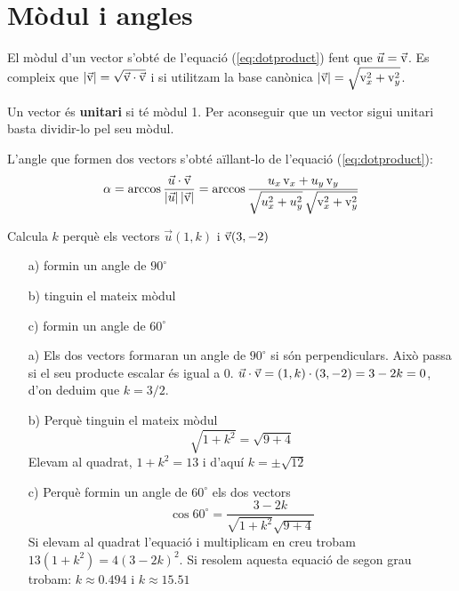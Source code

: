 \section{Mòdul i angles}
\begin{theorybox}
	El mòdul d'un vector s'obté de l'equació (\ref{eq:dotproduct}) fent que $\vec u = \vec{\mathrm{v}}$. Es compleix que $|\vec{\mathrm{v}}| = \sqrt{\vec{\mathrm{v}} \cdot \vec{\mathrm{v}}}$ i si utilitzam la base canònica  $| \vec{\mathrm{v}} |=\sqrt{\mathrm{v}_x^2+\mathrm{v}_y^2}$.
	
	Un vector és \textbf{unitari} si té mòdul 1. Per aconseguir que un vector sigui unitari basta dividir-lo pel seu mòdul.
	
	L'angle que formen dos vectors s'obté aïllant-lo de l'equació  (\ref{eq:dotproduct}):
	 \begin{equation}
	\label{eq:angle}
	\alpha = \arccos \dfrac{\vec u \cdot \vec{\mathrm{v}}}{|\vec u|\, |\vec{\mathrm{v}}|} = \arccos \dfrac{ u_x \, \mathrm{v}_x + u_y\, \mathrm{v}_y }{\sqrt{u_x^2+u_y^2} \, \sqrt{\mathrm{v}_x^2+\mathrm{v}_y^2}} 
	\end{equation}
\end{theorybox}


\begin{resolt}[E]{Calcula $k$ perquè els vectors $\vec u(1, k)$ i $\vec{\mathrm{v}}(3,-2)$ \vspace{1em}
		
		\begin{enumerate}\setlength\itemsep{1em}
			\item[a)] formin un angle de $90^\circ$
			
			
			
			\item[b)] tinguin el mateix mòdul
			
			
			\item[c)] formin un angle de $60^\circ$
		\end{enumerate}	
	}
\begin{enumerate} 
	\item[a)] Els dos vectors formaran un angle de $90^\circ$ si són perpendiculars. Això passa si el seu producte escalar és igual a 0. $\vec u \cdot \vec{\mathrm{v}} = (1, k) \cdot (3,-2) = 3-2k=0$, d'on deduim que $k=3/2$. 
	
	\item[b)] Perquè tinguin el mateix mòdul
	\begin{equation*}
	\sqrt{1+k^2} = \sqrt{9+4}
	\end{equation*}
	Elevam al quadrat, $1+k^2=13$ i d'aquí $k=\pm \sqrt{12}$
	
	
	\item[c)] Perquè formin un angle de $60^\circ$ els dos vectors
	\begin{equation*}
	\cos 60^\circ = \frac{3-2k}{\sqrt{1+k^2}\sqrt{9+4}}
	\end{equation*}
	Si elevam al quadrat l'equació i multiplicam en creu trobam $13(1+k^2)=4(3-2k)^2$. Si resolem aquesta equació de segon grau trobam: $k\approx 0.494$ i $k\approx 15.51$
\end{enumerate}
\end{resolt}


